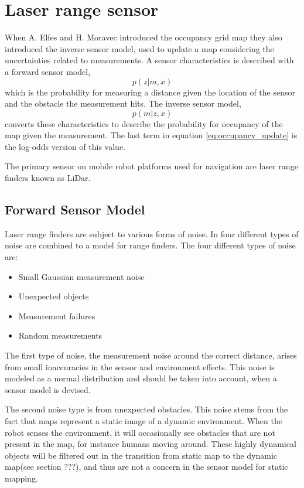 \section{Laser range sensor}
\label{sec:laser_range_sensor}
When A. Elfes and H. Moravec introduced the occupancy grid map they also introduced the inverse sensor model, used to update a map considering the uncertainties related to measurements. 
A sensor characteristics is described with a forward sensor model, 
\begin{equation*}
	p(z|m,x)
\end{equation*}
which is the probability for measuring a distance given the location of the sensor and the obstacle the measurement hits. 
The inverse sensor model,
\begin{equation*}
	p(m|z,x)
\end{equation*}
converts these characteristics to describe the probability for occupancy of the map given the measurement. The last term in equation \vref{eq:occupancy_update} is the log-odds version of this value.

The primary sensor on mobile robot platforms used for navigation are laser range finders known as LiDar.

\subsection{Forward Sensor Model}
Laser range finders are subject to various forms of noise. In \cite{probRob} four different types of noise are combined to a model for range finders. 
The four different types of noise are:

\begin{itemize}
	\item Small Gaussian measurement noise
	\item Unexpected objects
	\item Measurement failures
	\item Random measurements
\end{itemize}

The first type of noise, the measurement noise around the correct distance, arises from small inaccuracies in the sensor and environment effects. This noise is modeled as a normal distribution and should be taken into account, when a sensor model is devised. 

The second noise type is from unexpected obstacles. This noise stems from the fact that maps represent a static image of a dynamic environment. When the robot senses the environment, it will occasionally see obstacles that are not present in the map, for instance humans moving around. These highly dynamical objects will be filtered out in the transition from static map to the dynamic map(see section ???), and thus are not a concern in the sensor model for static mapping.

